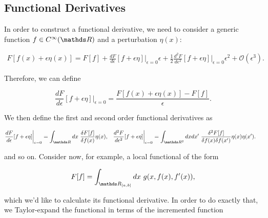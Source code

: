 \documentclass{homework}
\begin{document}
\subsection{Functional Derivatives}

In order to construct a functional derivative, we need to consider a generic function $f \in C^{\infty}(\R)$ and a perturbation $\eta(x)$:

\begin{align*}
    F[f(x) + \epsilon \eta(x)] = F[f] + \frac{dF}{d\epsilon}[f+\epsilon \eta]\bigg|_{\epsilon = 0} \epsilon + \frac{1}{2} \frac{d^2 F}{d\epsilon^2}[f+\epsilon \eta]\bigg|_{\epsilon = 0} \epsilon^2 + \mathcal{O}(\epsilon^3).
\end{align*}

Therefore, we can define 

$$
\frac{dF}{d\epsilon}[f+\epsilon \eta]\bigg|_{\epsilon = 0} = \frac{ F[f(x) + \epsilon \eta(x)]  - F[f]}{\epsilon}.
$$

We then define the first and second order functional derivatives as 

\begin{align}
\frac{dF}{d\epsilon}[f+\epsilon \eta]\bigg|_{\epsilon = 0} &= \int_{\R} dx \blanky \frac{\delta F[f]}{\delta f(x)} \eta(x),
& \frac{d^2 F}{d\epsilon^2}[f+\epsilon \eta]\bigg|_{\epsilon = 0} &= \int_{\R^2} dx dx' \blanky \frac{\delta^2 F[f]}{\delta f(x) \delta f(x')} \eta(x) \eta(x').
\end{align}

and so on. Consider now, for example, a local functional of the form

$$
F[f] = \int_{\R_{[a,b]}} dx \blanky g(x, f(x), f'(x)),
$$

which we'd like to calculate its functional derivative. In order to do exactly that, we Taylor-expand the functional in terms of the incremented function 
\end{document}
